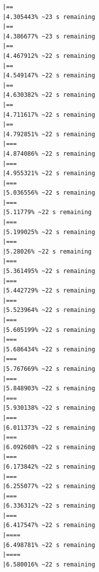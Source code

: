\documentclass{article}\usepackage[]{graphicx}\usepackage[]{xcolor}
\makeatletter
\newenvironment{kframe}{%
 \def\at@end@of@kframe{}%
 \ifinner\ifhmode%
  \def\at@end@of@kframe{\end{minipage}}%
  \begin{minipage}{\columnwidth}%
 \fi\fi%
 \def\FrameCommand##1{\hskip\@totalleftmargin \hskip-\fboxsep
 \colorbox{shadecolor}{##1}\hskip-\fboxsep
     \hskip-\linewidth \hskip-\@totalleftmargin \hskip\columnwidth}%
 \MakeFramed {\advance\hsize-\width
   \@totalleftmargin\z@ \linewidth\hsize
   \@setminipage}}%
 {\par\unskip\endMakeFramed%
 \at@end@of@kframe}
\newenvironment{knitrout}{}{} %
\makeatother
\begin{document}
\begin{knitrout}
\begin{kframe}
\begin{verbatim}
|==                                                            |4.305443% ~23 s remaining 
|==                                                            |4.386677% ~23 s remaining 
|==                                                            |4.467912% ~22 s remaining 
|==                                                            |4.549147% ~22 s remaining 
|==                                                            |4.630382% ~22 s remaining 
|==                                                            |4.711617% ~22 s remaining 
|==                                                            |4.792851% ~22 s remaining 
|===                                                           |4.874086% ~22 s remaining 
|===                                                           |4.955321% ~22 s remaining 
|===                                                           |5.036556% ~22 s remaining 
|===                                                           |5.11779% ~22 s remaining  
|===                                                           |5.199025% ~22 s remaining 
|===                                                           |5.28026% ~22 s remaining  
|===                                                           |5.361495% ~22 s remaining 
|===                                                           |5.442729% ~22 s remaining 
|===                                                           |5.523964% ~22 s remaining 
|===                                                           |5.605199% ~22 s remaining 
|===                                                           |5.686434% ~22 s remaining 
|===                                                           |5.767669% ~22 s remaining 
|===                                                           |5.848903% ~22 s remaining 
|===                                                           |5.930138% ~22 s remaining 
|===                                                           |6.011373% ~22 s remaining 
|===                                                           |6.092608% ~22 s remaining 
|===                                                           |6.173842% ~22 s remaining 
|===                                                           |6.255077% ~22 s remaining 
|===                                                           |6.336312% ~22 s remaining 
|===                                                           |6.417547% ~22 s remaining 
|====                                                          |6.498781% ~22 s remaining 
|====                                                          |6.580016% ~22 s remaining 

\end{verbatim}
\end{kframe}
\end{knitrout}
\end{document}
